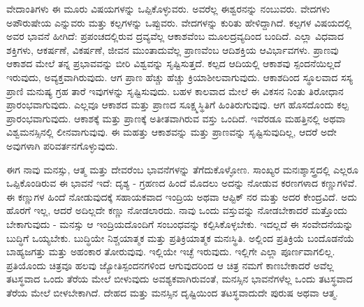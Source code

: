 ವೇದಾಂತಿಗಳು ಈ ಮೂರು ವಿಷಯಗಳನ್ನು ಒಪ್ಪಿಕೊಳ್ಳುವರು. ಅವರೆಲ್ಲ ಈಶ್ವರನನ್ನು ನಂಬುವರು. ವೇದಗಳು ಅಪೌರುಷೇಯ ಎನ್ನುವರು ಮತ್ತು ಕಲ್ಪಗಳನ್ನು ಒಪ್ಪುವರು. ವೇದಗಳನ್ನು ಕುರಿತು ಹೇಳಿದ್ದಾಗಿದೆ. ಕಲ್ಪಗಳ ವಿಷಯದಲ್ಲಿ ಅವರ ಭಾವನೆ ಹೀಗಿದೆ: ಪ್ರಪಂಚದಲ್ಲಿರುವ ದ್ರವ್ಯವೆಲ್ಲ ಆಕಾಶವೆಂಬ ಮೂಲದ್ರವ್ಯದಿಂದ ಬಂದಿದೆ. ಎಲ್ಲಾ ವಿಧವಾದ ಶಕ್ತಿಗಳು, ಆಕರ್ಷಣೆ, ವಿಕರ್ಷಣೆ, ಜೀವನ ಮುಂತಾದುವೆಲ್ಲ ಪ್ರಾಣವೆಂಬ ಆದಿಶಕ್ತಿಯ ಆವಿರ್ಭಾವಗಳು. ಪ್ರಾಣವು ಆಕಾಶದ ಮೇಲೆ ತನ್ನ ಪ್ರಭಾವವನ್ನು ಬೀರಿ ವಿಶ್ವವನ್ನು ಸೃಷ್ಟಿಸುತ್ತದೆ. ಕಲ್ಪದ ಆದಿಯಲ್ಲಿ ಆಕಾಶವು ಸ್ಪಂದನೆಯಿಲ್ಲದೆ ಇರುವುದು, ಅವ್ಯಕ್ತವಾಗಿರುವುದು. ಆಗ ಪ್ರಾಣ ಹೆಚ್ಚು ಹೆಚ್ಚು ಕ್ರಿಯಾಶೀಲವಾಗುವುದು. ಆಕಾಶದಿಂದ ಸ್ಥೂಲವಾದ ಸಸ್ಯ ಪ್ರಾಣಿ ಮನುಷ್ಯ ಗ್ರಹ ತಾರೆ ಇವುಗಳನ್ನು ಸೃಷ್ಟಿಸುವುದು. ಬಹಳ ಕಾಲವಾದ ಮೇಲೆ ಈ ವಿಕಸನ ನಿಂತು ತಿರೋಧಾನ  ಪ್ರಾರಂಭವಾಗುವುದು. ಎಲ್ಲವೂ ಆಕಾಶದ ಮತ್ತು ಪ್ರಾಣದ ಸೂಕ್ಷ್ಮಸ್ಥಿತಿಗೆ ಹಿಂತಿರುಗುವುವು. ಆಗ ಹೊಸದೊಂದು ಕಲ್ಪ ಪ್ರಾರಂಭವಾಗುವುದು. ಆಕಾಶಕ್ಕೆ ಮತ್ತು ಪ್ರಾಣಕ್ಕೆ ಅತೀತವಾಗಿರುವ ವಸ್ತು ಒಂದಿದೆ. ಇವೆರಡೂ ಮಹತ್ತಿನಲ್ಲಿ ಅಥವಾ ವಿಶ್ವಮನಸ್ಸಿನಲ್ಲಿ ಲೀನವಾಗುವುವು. ಈ ಮಹತ್ತು ಆಕಾಶವನ್ನು ಮತ್ತು ಪ್ರಾಣವನ್ನು ಸೃಷ್ಟಿಸುವುದಿಲ್ಲ, ಆದರೆ ಅದೇ ಅವುಗಳಾಗಿ ಪರಿವರ್ತನಗೊಳ್ಳುವುದು.

ಈಗ ನಾವು ಮನಸ್ಸು, ಆತ್ಮ ಮತ್ತು ದೇವರೆಂಬ ಭಾವನೆಗಳನ್ನು ತೆಗೆದುಕೊಳ್ಳೋಣ. ಸಾಂಖ್ಯರ ಮನಃಶ್ಶಾಸ್ತ್ರದಲ್ಲಿ ಎಲ್ಲರೂ ಒಪ್ಪಿಕೊಂಡಿರುವ ಈ ಭಾವನೆ ಇದೆ: ದೃಶ್ಯ - ಗ್ರಹಣದ ಹಿಂದೆ ಮೊದಲು ಅದನ್ನು ನೋಡುವ ಕರಣಗಳಾದ ಕಣ್ಣುಗಳಿವೆ. ಈ ಕಣ್ಣುಗಳ ಹಿಂದೆ ನೋಡುವುದಕ್ಕೆ ಸಹಾಯಕವಾದ ಇಂದ್ರಿಯ ಅಥವಾ ಆಪ್ಟಿಕ್ ನರ ಮತ್ತು ಅದರ ಕೇಂದ್ರವಿದೆ. ಅದು ಹೊರಗೆ ಇಲ್ಲ, ಆದರೆ ಅದಿಲ್ಲದೇ ಕಣ್ಣು ನೋಡಲಾರದು. ನಾವು ಒಂದು ವಸ್ತುವನ್ನು ನೋಡಬೇಕಾದರೆ ಮತ್ತೊಂದು ಬೇಕಾಗುವುದು - ಮನಸ್ಸು ಆ ಇಂದ್ರಿಯದೊಂದಿಗೆ ಸಂಬಂಧವನ್ನು ಕಲ್ಪಿಸಿಕೊಳ್ಳಬೇಕು. ಇದಲ್ಲದೆ ಈ ಸಂವೇದನೆಯನ್ನು  ಬುದ್ಧಿಗೆ ಒಯ್ಯಬೇಕು. ಬುದ್ಧಿಯೇ ನಿಶ್ಚಯಾತ್ಮಕ ಮತ್ತು ಪ್ರತಿಕ್ರಿಯಾತ್ಮಕ ಮನಃಸ್ಥಿತಿ. ಅಲ್ಲಿಂದ ಪ್ರತಿಕ್ರಿಯೆ ಬಂದೊಡನೆಯೆ ಬಾಹ್ಯಜಗತ್ತು ಮತ್ತು ಅಹಂಕಾರ ತೋರುವುವು. ಇಲ್ಲಿಯೇ ಇಚ್ಛೆ ಇರುವುದು. ಇಲ್ಲಿಗೇ ಎಲ್ಲಾ ಪೂರ್ಣವಾಗಲಿಲ್ಲ. ಪ್ರತಿಯೊಂದು ಚಿತ್ರವೂ ಹಲವು ಜ್ಯೋತಿಸ್ಪಂದನಗಳಿಂದ ಆಗುವುದರಿಂದ ಆ ಚಿತ್ರ ನಮಗೆ ಕಾಣಬೇಕಾದರೆ ಅವೆಲ್ಲ ತಟಸ್ಥವಾದ ಒಂದು ತೆರೆಯ ಮೇಲೆ ಬೀಳುವುದು ಅವಶ್ಯಕವಾಗಿರುವಂತೆ, ಮನಸ್ಸಿನ ಭಾವನೆಗಳೆಲ್ಲ ಒಂದು ತಟಸ್ಥವಾದ ತೆರೆಯ ಮೇಲೆ ಬೀಳಬೇಕಾಗಿದೆ. ದೇಹದ ಮತ್ತು ಮನಸ್ಸಿನ ದೃಷ್ಟಿಯಿಂದ ತಟಸ್ಥವಾದುದೇ ಪುರುಷ ಅಥವಾ ಆತ್ಮ.

